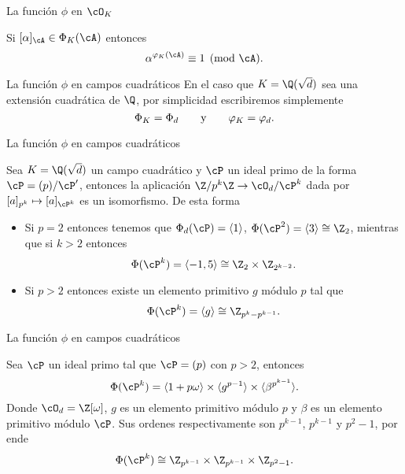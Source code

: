\begin{frame}{La función $\phi$ en $\cO_K$}
  \begin{theorem}
    Si $[\alpha]_\cA \in \Phi_K(\cA)$ entonces
    \[
         \alpha^{\varphi_K(\cA)} \eqv 1 \pmod{\cA}.
    \]
\end{theorem}
\end{frame}



\begin{frame}{La función $\phi$ en campos cuadráticos}
  En el caso que $K = \Q(\sqrt{d})$ sea una extensión cuadrática de $\Q$, por simplicidad escribiremos simplemente
\[
    \Phi_K = \Phi_d \qquad\text{y}\qquad
    \varphi_K = \varphi_d.
\]
\end{frame}


\begin{frame}{La función $\phi$ en campos cuadráticos}
  \begin{theorem}
    Sea $K = \Q(\sqrt{d})$ un campo cuadrático y $\cP$ un ideal primo de la forma $\cP = (p)/\cP'$, entonces la aplicación $\Z/p^k\Z \to \cO_d/\cP^k$ dada por $[a]_{p^k} \mapsto [a]_{\cP^k}$ es un isomorfismo. De esta forma
    \begin{itemize}
        \item Si $p = 2$ entonces tenemos que $\Phi_d(\cP) = \inner{1}$, $\Phi(\cP^2) = \inner{3} \cong \Z_2$, mientras que si $k>2$ entonces
        \[
            \Phi(\cP^k) = \inner{-1, 5} \cong \Z_2 \times \Z_{2^{k-2}}.
        \]

        \item Si $p > 2$ entonces existe un elemento primitivo $g$ módulo $p$ tal que
        \[
            \Phi(\cP^k) = \inner{g} \cong \Z_{p^k-p^{k-1}}.
        \]
    \end{itemize}
\end{theorem}
\end{frame}



\begin{frame}{La función $\phi$ en campos cuadráticos}
  \begin{theorem}
    Sea $\cP$ un ideal primo tal que $\cP = (p)$ con $p>2$, entonces
    \[
    \Phi(\cP^k) = \inner{1+p\omega} \times \inner{g^{p-1}} \times \inner{\beta^{p^{k-1}}}.
    \]
    Donde $\cO_d = \Z[\omega]$, $g$ es un elemento primitivo módulo $p$ y $\beta$ es un elemento primitivo módulo $\cP$. Sus ordenes respectivamente son $p^{k-1}$, $p^{k-1}$ y $p^2-1$, por ende
    \[
        \Phi(\cP^k) \cong \Z_{p^{k-1}} \times \Z_{p^{k-1}} \times \Z_{p^2-1}.
    \]
\end{theorem}
\end{frame}


